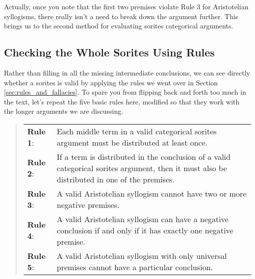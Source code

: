 \begin{center}
\end{center}

Actually, once you note that the first two premises violate Rule 3 for Aristotelian syllogisms, there really isn't a need to break down the argument further. This brings us to the second method for evaluating sorites categorical arguments.

\subsection{Checking the Whole Sorites Using Rules}

Rather than filling in all the missing intermediate conclusions, we can see directly whether a sorites is valid by applying the rules we went over in Section  \ref{sec:rules_and_fallacies}. To spare you from flipping back and forth too much in the text, let's repeat the five basic rules here, modified so that they work with the longer arguments we are discussing.

\begin{quotation}
\begin{tabu}{X[1] X[9]}
\textbf{Rule 1}: & Each middle term in a valid categorical sorites argument must be distributed at least once. \\
\textbf{Rule 2}: & If a term is distributed in the conclusion of a valid categorical sorites argument, then it must also be distributed in one of the premises. \\
\textbf{Rule 3}: & A valid Aristotelian syllogism cannot have two or more negative premises. \\
\textbf{Rule 4}: & A valid Aristotelian syllogism can have a negative conclusion if and only if it has exactly one negative premise.\\
\textbf{Rule 5}: & A valid Aristotelian syllogism with only universal premises cannot have a particular conclusion.
\end{tabu}
\end{quotation}

